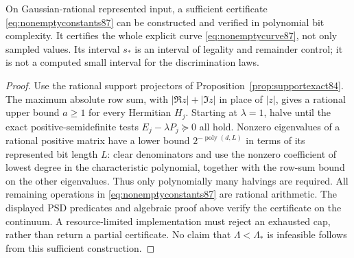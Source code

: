\begin{proposition}\label{prop:nonemptyexact87}
On Gaussian-rational represented input, a sufficient certificate
\eqref{eq:nonemptyconstants87} can be constructed and verified in
polynomial bit complexity.  It certifies the whole explicit curve
\eqref{eq:nonemptycurve87}, not only sampled values.  Its interval
$s_*$ is an interval of legality and remainder control; it is not a
computed small interval for the discrimination laws.
\end{proposition}
\begin{proof}
Use the rational support projectors of
Proposition~\ref{prop:supportexact84}.  The maximum absolute row sum,
with $|\Re z|+|\Im z|$ in place of $|z|$, gives a rational upper
bound $a\ge1$ for every Hermitian $H_j$.
Starting at $\lambda=1$, halve until the exact positive-semidefinite
tests $E_j-\lambda P_j\succeq0$ all hold.  Nonzero eigenvalues of a
rational positive matrix have a lower bound $2^{-\operatorname{poly}(d,L)}$
in terms of its represented bit length $L$: clear denominators and
use the nonzero coefficient of lowest degree in the characteristic
polynomial, together with the row-sum bound on the other eigenvalues.
Thus only polynomially many halvings are required.  All remaining
operations in \eqref{eq:nonemptyconstants87} are rational arithmetic.
The displayed PSD predicates and algebraic proof above verify the
certificate on the continuum.  A resource-limited implementation
must reject an exhausted cap, rather than return a partial certificate.
No claim that $\Lambda<\Lambda_*$ is infeasible follows from this
sufficient construction.
\end{proof}
